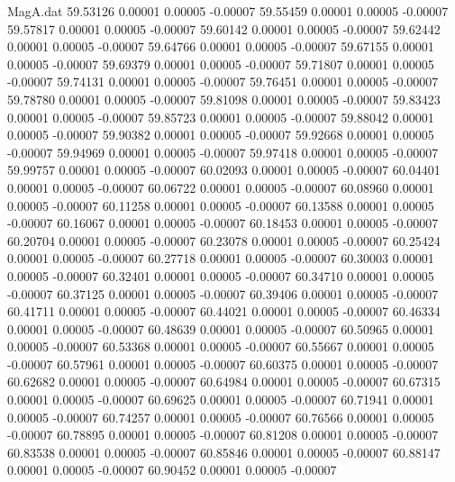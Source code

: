 \begin{filecontents}{MagA.dat}
  59.53126    0.00001    0.00005   -0.00007
  59.55459    0.00001    0.00005   -0.00007
  59.57817    0.00001    0.00005   -0.00007
  59.60142    0.00001    0.00005   -0.00007
  59.62442    0.00001    0.00005   -0.00007
  59.64766    0.00001    0.00005   -0.00007
  59.67155    0.00001    0.00005   -0.00007
  59.69379    0.00001    0.00005   -0.00007
  59.71807    0.00001    0.00005   -0.00007
  59.74131    0.00001    0.00005   -0.00007
  59.76451    0.00001    0.00005   -0.00007
  59.78780    0.00001    0.00005   -0.00007
  59.81098    0.00001    0.00005   -0.00007
  59.83423    0.00001    0.00005   -0.00007
  59.85723    0.00001    0.00005   -0.00007
  59.88042    0.00001    0.00005   -0.00007
  59.90382    0.00001    0.00005   -0.00007
  59.92668    0.00001    0.00005   -0.00007
  59.94969    0.00001    0.00005   -0.00007
  59.97418    0.00001    0.00005   -0.00007
  59.99757    0.00001    0.00005   -0.00007
  60.02093    0.00001    0.00005   -0.00007
  60.04401    0.00001    0.00005   -0.00007
  60.06722    0.00001    0.00005   -0.00007
  60.08960    0.00001    0.00005   -0.00007
  60.11258    0.00001    0.00005   -0.00007
  60.13588    0.00001    0.00005   -0.00007
  60.16067    0.00001    0.00005   -0.00007
  60.18453    0.00001    0.00005   -0.00007
  60.20704    0.00001    0.00005   -0.00007
  60.23078    0.00001    0.00005   -0.00007
  60.25424    0.00001    0.00005   -0.00007
  60.27718    0.00001    0.00005   -0.00007
  60.30003    0.00001    0.00005   -0.00007
  60.32401    0.00001    0.00005   -0.00007
  60.34710    0.00001    0.00005   -0.00007
  60.37125    0.00001    0.00005   -0.00007
  60.39406    0.00001    0.00005   -0.00007
  60.41711    0.00001    0.00005   -0.00007
  60.44021    0.00001    0.00005   -0.00007
  60.46334    0.00001    0.00005   -0.00007
  60.48639    0.00001    0.00005   -0.00007
  60.50965    0.00001    0.00005   -0.00007
  60.53368    0.00001    0.00005   -0.00007
  60.55667    0.00001    0.00005   -0.00007
  60.57961    0.00001    0.00005   -0.00007
  60.60375    0.00001    0.00005   -0.00007
  60.62682    0.00001    0.00005   -0.00007
  60.64984    0.00001    0.00005   -0.00007
  60.67315    0.00001    0.00005   -0.00007
  60.69625    0.00001    0.00005   -0.00007
  60.71941    0.00001    0.00005   -0.00007
  60.74257    0.00001    0.00005   -0.00007
  60.76566    0.00001    0.00005   -0.00007
  60.78895    0.00001    0.00005   -0.00007
  60.81208    0.00001    0.00005   -0.00007
  60.83538    0.00001    0.00005   -0.00007
  60.85846    0.00001    0.00005   -0.00007
  60.88147    0.00001    0.00005   -0.00007
  60.90452    0.00001    0.00005   -0.00007

\end{filecontents}
